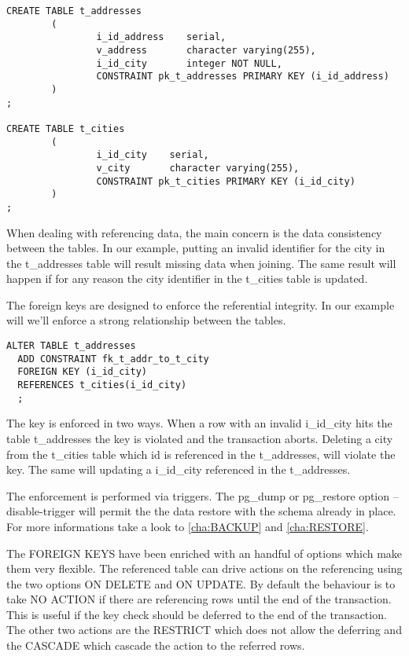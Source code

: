 \begin{lstlisting}[style=pgsql]
CREATE TABLE t_addresses
        (
                i_id_address    serial,
                v_address       character varying(255),
                i_id_city       integer NOT NULL,
                CONSTRAINT pk_t_addresses PRIMARY KEY (i_id_address)
        )
;

CREATE TABLE t_cities
        (
                i_id_city    serial,
                v_city       character varying(255),
                CONSTRAINT pk_t_cities PRIMARY KEY (i_id_city)
        )
;

\end{lstlisting}

When dealing with referencing data, the main concern is the data consistency between the tables. 
In our example, putting an invalid identifier for the city in the t\_addresses table will result 
missing data when joining. The same result will happen if for any reason the city identifier in 
the t\_cities table is updated.\newline

The foreign keys are designed to enforce the referential integrity. In our example will we'll 
enforce a strong relationship between the tables.

\begin{lstlisting}[style=pgsql]
ALTER TABLE t_addresses 
  ADD CONSTRAINT fk_t_addr_to_t_city
  FOREIGN KEY (i_id_city)
  REFERENCES t_cities(i_id_city)
  ;

\end{lstlisting}

The key is enforced in two ways. When a row with an invalid i\_id\_city hits the table t\_addresses 
the key is violated and the transaction aborts. Deleting a city from the t\_cities table which id 
is referenced in the t\_addresses, will violate the key. The same will updating a i\_id\_city 
referenced in the t\_addresses.\newline

The enforcement is performed via triggers. The pg\_dump or pg\_restore option --disable-trigger 
will permit the the data restore with the schema already in place. For more informations take a 
look to \ref{cha:BACKUP} and  \ref{cha:RESTORE}.\newline

The FOREIGN KEYS have been enriched with an handful of options which make them very flexible. 
The referenced table can drive actions on the referencing using the two options ON DELETE and ON 
UPDATE. By default the behaviour is to take NO ACTION if there are referencing rows until the 
end of the transaction. This is useful if the key check should be deferred to the end of the 
transaction. The other two actions are the RESTRICT which does not allow the deferring and 
the CASCADE which cascade the action to the referred rows. 


